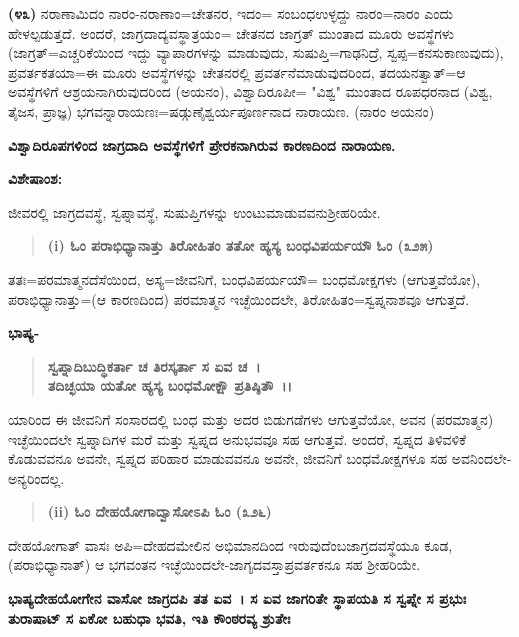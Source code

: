 \textbf{(೪೩)} ನರಾಣಾಮಿದಂ ನಾರಂ-ನರಾಣಾಂ=ಚೇತನರ, ಇದಂ= ಸಂಬಂಧಉಳ್ಳದ್ದು ನಾರಂ=ನಾರಂ ಎಂದು ಹೇಳಲ್ಪಡುತ್ತದೆ. ಅಂದರೆ, ಜಾಗ್ರದಾದ್ಯವಸ್ಥಾತ್ರಯಂ= ಚೇತನದ ಜಾಗ್ರತ್ ಮುಂತಾದ ಮೂರು ಅವಸ್ಥೆಗಳು (ಜಾಗ್ರತ್=ಎಚ್ಚರಿಕೆಯಿಂದ ಇದ್ದು ವ್ಯಾಪಾರಗಳನ್ನು ಮಾಡುವುದು, ಸುಷುಪ್ತಿ=ಗಾಢನಿದ್ರೆ, ಸ್ವಪ್ಪ=ಕನಸುಕಾಣುವುದು), ಪ್ರವರ್ತಕತಯಾ=ಈ ಮೂರು ಅವಸ್ಥೆಗಳನ್ನು ಚೇತನರಲ್ಲಿ ಪ್ರವರ್ತನೆಮಾಡುವುದರಿಂದ, ತದಯನತ್ವಾತ್=ಆ ಅವಸ್ಥೆಗಳಿಗೆ ಆಶ್ರಯನಾಗಿರುವುದರಿಂದ (ಅಯನಂ), ವಿಶ್ವಾದಿರೂಪೀ= "ವಿಶ್ವ" ಮುಂತಾದ ರೂಪಧರನಾದ (ವಿಶ್ವ, ತೈಜಸ, ಪ್ರಾಜ್ಞ) ಭಗವನ್ನಾರಾಯಣಃ=ಷಡ್ಗುಣೈಶ್ವರ್ಯ\-ಪೂರ್ಣನಾದ ನಾರಾಯಣ. (ನಾರಂ ಅಯನಂ)

\begin{center}
\textbf{ವಿಶ್ವಾದಿರೂಪಗಳಿಂದ ಜಾಗ್ರದಾದಿ ಅವಸ್ಥೆಗಳಿಗೆ ಪ್ರೇರಕನಾಗಿರುವ ಕಾರಣದಿಂದ ನಾರಾಯಣ.}
\end{center}

\noindent
\textbf{ವಿಶೇಷಾಂಶ:\enginline{-}}

ಜೀವರಲ್ಲಿ ಜಾಗ್ರದವಸ್ಥೆ, ಸ್ವಪ್ನಾವಸ್ಥೆ, ಸುಷುಪ್ತಿಗಳನ್ನು ಉಂಟುಮಾಡುವವನು\break ಶ‍್ರೀಹರಿಯೇ.

\begin{verse}
\textbf{(i) ಓಂ ಪರಾಭಿಧ್ಯಾನಾತ್ತು ತಿರೋಹಿತಂ ತತೋ ಹ್ಯಸ್ಯ ಬಂಧವಿಪರ್ಯಯೌ ಓಂ (೩\enginline{-}೨\enginline{-}೫)}
\end{verse}

ತತಃ=ಪರಮಾತ್ಮನದೆಸೆಯಿಂದ, ಅಸ್ಯ=ಜೀವನಿಗೆ, ಬಂಧವಿಪರ್ಯಯೌ= ಬಂಧಮೋಕ್ಷಗಳು (ಆಗುತ್ತವೆಯೋ), ಪರಾಭಿಧ್ಯಾನಾತ್ತು=(ಆ ಕಾರಣದಿಂದ) ಪರಮಾತ್ಮನ ಇಚ್ಛೆಯಿಂದಲೇ, ತಿರೋಹಿತಂ=ಸ್ವಪ್ನನಾಶವೂ ಆಗುತ್ತದೆ.

\noindent
\textbf{ಭಾಷ್ಯ-}

\begin{verse}
\textbf{ಸ್ವಪ್ನಾದಿಬುದ್ಧಿಕರ್ತಾ ಚ ತಿರಸ್ಕರ್ತಾ ಸ ಏವ ಚ~।}\\\textbf{ತದಿಚ್ಛಯಾ ಯತೋ ಹ್ಯಸ್ಯ ಬಂಧಮೋಕ್ಷೌ ಪ್ರತಿಷ್ಠಿತೌ~।।}
\end{verse}


ಯಾರಿಂದ ಈ ಜೀವನಿಗೆ ಸಂಸಾರದಲ್ಲಿ ಬಂಧ ಮತ್ತು ಅದರ ಬಿಡುಗಡೆಗಳು ಆಗುತ್ತ\-ವೆಯೋ, ಅವನ (ಪರಮಾತ್ಮನ) ಇಚ್ಛೆಯಿಂದಲೇ ಸ್ವಪ್ನಾದಿಗಳ ಮರೆ ಮತ್ತು ಸ್ವಪ್ನದ ಅನು\-ಭವವೂ ಸಹ ಆಗುತ್ತವೆ. ಅಂದರೆ, ಸ್ವಪ್ನದ ತಿಳಿವಳಿಕೆ ಕೊಡುವವನೂ ಅವನೇ, ಸ್ವಪ್ನದ ಪರಿಹಾರ ಮಾಡುವವನೂ ಅವನೇ, ಜೀವನಿಗೆ ಬಂಧಮೋಕ್ಷಗಳೂ ಸಹ ಅವನಿಂದಲೇ-ಅನ್ಯರಿಂದಲ್ಲ.

\begin{verse}
\textbf{(ii) ಓಂ ದೇಹಯೋಗಾದ್ವಾಸೋಽಪಿ ಓಂ (೩\enginline{-}೨\enginline{-}೬)}
\end{verse}

ದೇಹಯೋಗಾತ್ ವಾಸಃ ಅಪಿ=ದೇಹದಮೇಲಿನ ಅಭಿಮಾನದಿಂದ ಇರುವುದೆಂಬ\break ಜಾಗ್ರದವಸ್ಥೆಯೂ ಕೂಡ, (ಪರಾಭಿಧ್ಯಾನಾತ್) ಆ ಭಗವಂತನ ಇಚ್ಛೆಯಿಂದಲೇ-ಜಾಗೃದ\-ವಸ್ತಾಪ್ರವರ್ತಕನೂ ಸಹ ಶ‍್ರೀಹರಿಯೇ.

\textbf{ಭಾಷ್ಯ\enginline{-}ದೇಹಯೋಗೇನ ವಾಸೋ ಜಾಗ್ರದಪಿ ತತ ಏವ~। ಸ ಏವ ಜಾಗರಿತೇ ಸ್ಥಾಪಯತಿ ಸ ಸ್ವಪ್ನೇ ಸ ಪ್ರಭುಃ ತುರಾಷಾಟ್ ಸ ಏಕೋ ಬಹುಧಾ ಭವತಿ, ಇತಿ ಕೌಂಠರವ್ಯ ಶ್ರುತೇಃ\enginline{-}}

